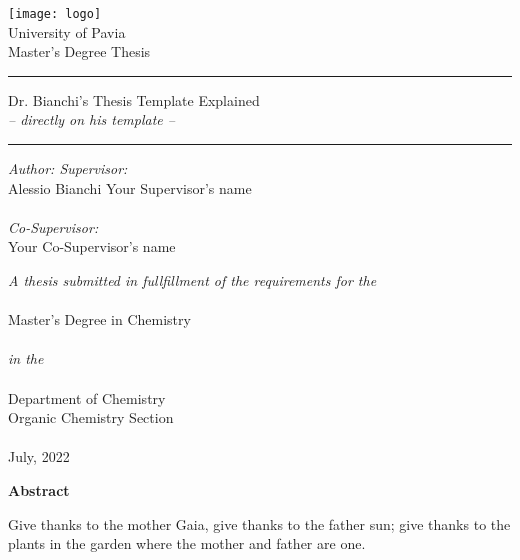 \documentclass[12pt,a4paper,twoside]{book}
\begin{document}
\thispagestyle{empty}
\begin{center} 
\texttt{[image: logo]}
\vspace{.5 cm} \\
{\LARGE \sc \color{reddy} University of Pavia}
\vspace{1 cm} \\
{\Large \sc Master's Degree Thesis} \vspace{1 cm}\\
\hrule height 1 pt \vspace{1cm}
\LARGE  Dr. Bianchi's Thesis Template Explained \\ \normalsize \it -- directly on his template --
\vspace{1cm}
\hrule height 1 pt
\end{center}
\vspace{1 cm}
\begin{center}
\begin{minipage}{.9\textwidth}
{\it Author: \hfill Supervisor:} \\
{\color{reddy} Alessio Bianchi \hfill Your Supervisor's name} \\ \\
\phantom{x} \hfill \textit{Co-Supervisor:}\\
\phantom{x} \hfill {\color{reddy} Your Co-Supervisor's name} \\
\end{minipage}
\vfill
{\it A thesis submitted in fullfillment of the requirements for the} \\ \ \\
{\color{reddy} Master's Degree in Chemistry} \\ \ \\
{\it in the} \\ \ \\
{\color{reddy} Department of Chemistry \\ Organic Chemistry Section}
\\ \ \\
July, 2022
\end{center}
\newpage
\thispagestyle{empty}

\begin{minipage}{.9\textwidth}
{\bf \LARGE\hfill\color{reddy}  Abstract} \vspace{20 pt}\\
Give thanks to the mother Gaia, give thanks to the father sun; give thanks to the plants in the garden where the mother and father are one.
\end{minipage}
\end{document}
